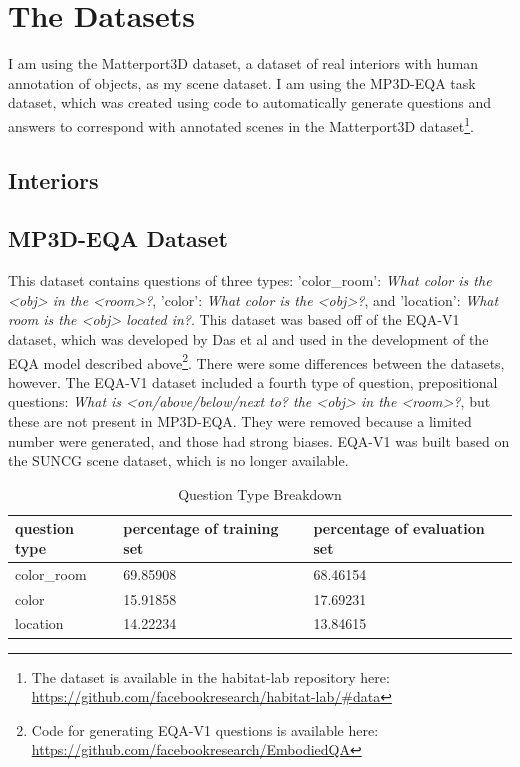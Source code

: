\section{The Datasets}
I am using the Matterport3D dataset, a dataset of real interiors with human annotation of objects, as my scene dataset\cite{matterport}. 
I am using the MP3D-EQA task dataset, which was created using code to automatically generate questions and answers to correspond with annotated scenes in the Matterport3D dataset\footnote{The dataset is available in the habitat-lab repository here: \url{https://github.com/facebookresearch/habitat-lab/#data}}\cite{eqa_matterport}. 


\subsection{Interiors}

\subsection{MP3D-EQA Dataset} 
This dataset contains questions of three types: 'color\_room': \emph{What color is the <obj> in the <room>?}, 'color': \emph{What color is the <obj>?}, and 'location': \emph{What room is the <obj> located in?}. This dataset was based off of the EQA-V1 dataset, which was developed by Das et al and used in the development of the EQA model described above\footnote{Code for generating EQA-V1 questions is available here: \url{https://github.com/facebookresearch/EmbodiedQA}}\cite{embodiedqa}. There were some differences between the datasets, however. The EQA-V1 dataset included a fourth type of question, prepositional questions: \emph{What is <on/above/below/next to? the <obj> in the <room>?}, but these are not present in MP3D-EQA. They were removed because a limited number were generated, and those had strong biases. %
EQA-V1 was built based on the SUNCG scene dataset, which is no longer available. %


\begin{table}[h]
\centering
\caption{Question Type Breakdown}
\begin{tabular}{ |l|l|l| }
\hline
\textbf{question type} & \textbf{percentage of training set} & \textbf{percentage of evaluation set} \\
\hline
color\_room & 69.85908 & 68.46154\\
color & 15.91858 & 17.69231\\
location & 14.22234 & 13.84615\\
\hline
\end{tabular}
\label{tab:q_breakdown}
\end{table}

